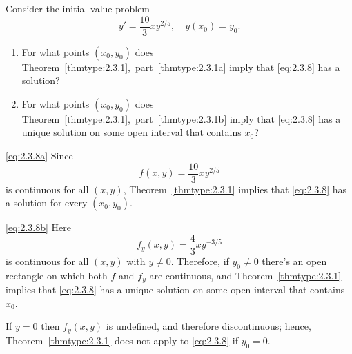 \documentclass{ximera}
\begin{document}
\begin{example}\label{example:2.3.5}
Consider the initial value problem
\begin{equation} \label{eq:2.3.8}
y' = \frac{10}{3}xy^{2/5}, \quad y(x_0) = y_0.
\end{equation}
\begin{enumerate}
\item\label{eq:2.3.8a}
For what points $(x_0,y_0)$ does Theorem~\ref{thmtype:2.3.1},~part~\ref{thmtype:2.3.1a}
imply that
\eqref{eq:2.3.8} has a solution?

\item\label{eq:2.3.8b}
For what points $(x_0,y_0)$ does Theorem~\ref{thmtype:2.3.1},~part~\ref{thmtype:2.3.1b}
imply that
\eqref{eq:2.3.8} has a  unique solution on some open interval that contains
$x_0$?
\end{enumerate}

\begin{explanation}
\ref{eq:2.3.8a} Since
$$
f(x,y) = \frac{10}{3}xy^{2/5}
$$
is continuous for all $(x,y)$,  Theorem~\ref{thmtype:2.3.1}
implies that \eqref{eq:2.3.8} has a solution for every $(x_0,y_0)$.

\ref{eq:2.3.8b} Here
$$
f_y(x,y) = \frac{4}{3}xy^{-3/5}
$$
is continuous for all $(x,y)$ with $y\neq 0$. Therefore, if $y_0\neq0$
there's an open rectangle on which both $f$ and $f_y$ are
continuous, and Theorem~\ref{thmtype:2.3.1} implies that \eqref{eq:2.3.8} has
a unique solution on some open interval that contains $x_0$.

If $y=0$ then $f_y(x,y)$ is undefined, and therefore discontinuous;
hence, Theorem~\ref{thmtype:2.3.1} does not apply to \eqref{eq:2.3.8} if
$y_0=0$.
\end{explanation}
\end{example}
\end{document}
